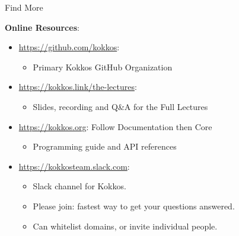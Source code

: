 \begin{frame}{Find More}

\textbf{Online Resources}:

\begin{itemize}
        \item \url{https://github.com/kokkos}:
                \begin{itemize}
                        \item Primary Kokkos GitHub Organization
                \end{itemize}
        \item \url{https://kokkos.link/the-lectures}:
                \begin{itemize}
			\item{Slides, recording and Q\&A for the Full Lectures}
                \end{itemize}
        \item \url{https://kokkos.org}: Follow Documentation then Core
                \begin{itemize}
                        \item Programming guide and API references
                \end{itemize}
        \item \url{https://kokkosteam.slack.com}:
                \begin{itemize}
                        \item Slack channel for Kokkos.
                        \item Please join: fastest way to get your questions answered.
                        \item Can whitelist domains, or invite individual people.
                \end{itemize}
\end{itemize}

\end{frame}



